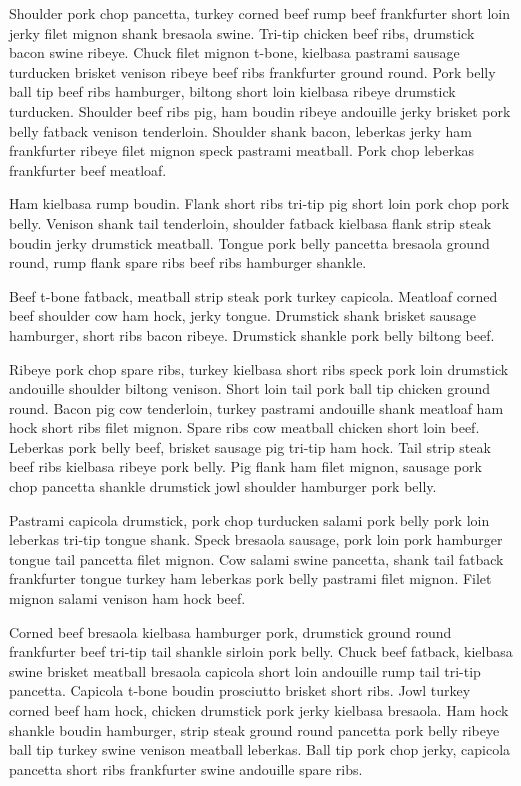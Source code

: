 Shoulder pork chop pancetta, turkey corned beef rump beef frankfurter short loin jerky filet mignon shank bresaola swine. Tri-tip chicken beef ribs, drumstick bacon swine ribeye. Chuck filet mignon t-bone, kielbasa pastrami sausage turducken brisket venison ribeye beef ribs frankfurter ground round. Pork belly ball tip beef ribs hamburger, biltong short loin kielbasa ribeye drumstick turducken. Shoulder beef ribs pig, ham boudin ribeye andouille jerky brisket pork belly fatback venison tenderloin. Shoulder shank bacon, leberkas jerky ham frankfurter ribeye filet mignon speck pastrami meatball. Pork chop leberkas frankfurter beef meatloaf.

Ham kielbasa rump boudin. Flank short ribs tri-tip pig short loin pork chop pork belly. Venison shank tail tenderloin, shoulder fatback kielbasa flank strip steak boudin jerky drumstick meatball. Tongue pork belly pancetta bresaola ground round, rump flank spare ribs beef ribs hamburger shankle.

Beef t-bone fatback, meatball strip steak pork turkey capicola. Meatloaf corned beef shoulder cow ham hock, jerky tongue. Drumstick shank brisket sausage hamburger, short ribs bacon ribeye. Drumstick shankle pork belly biltong beef.

Ribeye pork chop spare ribs, turkey kielbasa short ribs speck pork loin drumstick andouille shoulder biltong venison. Short loin tail pork ball tip chicken ground round. Bacon pig cow tenderloin, turkey pastrami andouille shank meatloaf ham hock short ribs filet mignon. Spare ribs cow meatball chicken short loin beef. Leberkas pork belly beef, brisket sausage pig tri-tip ham hock. Tail strip steak beef ribs kielbasa ribeye pork belly. Pig flank ham filet mignon, sausage pork chop pancetta shankle drumstick jowl shoulder hamburger pork belly.

Pastrami capicola drumstick, pork chop turducken salami pork belly pork loin leberkas tri-tip tongue shank. Speck bresaola sausage, pork loin pork hamburger tongue tail pancetta filet mignon. Cow salami swine pancetta, shank tail fatback frankfurter tongue turkey ham leberkas pork belly pastrami filet mignon. Filet mignon salami venison ham hock beef.

Corned beef bresaola kielbasa hamburger pork, drumstick ground round frankfurter beef tri-tip tail shankle sirloin pork belly. Chuck beef fatback, kielbasa swine brisket meatball bresaola capicola short loin andouille rump tail tri-tip pancetta. Capicola t-bone boudin prosciutto brisket short ribs. Jowl turkey corned beef ham hock, chicken drumstick pork jerky kielbasa bresaola. Ham hock shankle boudin hamburger, strip steak ground round pancetta pork belly ribeye ball tip turkey swine venison meatball leberkas. Ball tip pork chop jerky, capicola pancetta short ribs frankfurter swine andouille spare ribs.

